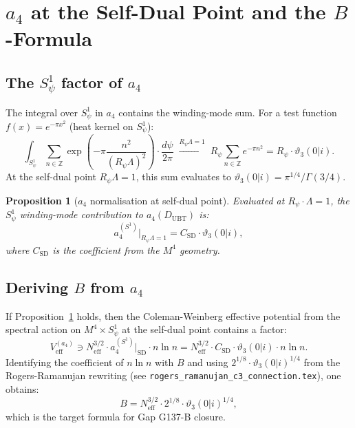 \documentclass[12pt,a4paper]{article}
\newtheorem{proposition}[theorem]{Proposition}
\theoremstyle{definition}
\theoremstyle{remark}
\begin{document}
\section{$a_4$ at the Self-Dual Point and the $B$-Formula}
\label{sec:self_dual}

\subsection{The $S^1_\psi$ factor of $a_4$}

The integral over $S^1_\psi$ in $a_4$ contains the winding-mode sum.
For a test function $f(x) = e^{-\pi x^2}$ (heat kernel on $S^1_\psi$):
\begin{equation}
  \int_{S^1_\psi} \sum_{n\in\mathbb{Z}}
  \exp\!\left(-\pi\frac{n^2}{(R_\psi\Lambda)^2}\right) \cdot \frac{d\psi}{2\pi}
  \;\xrightarrow{R_\psi\Lambda=1}\;
  R_\psi \sum_{n\in\mathbb{Z}} e^{-\pi n^2}
  = R_\psi \cdot\vartheta_3(0|i).
  \label{eq:a4_S1_sum}
\end{equation}
At the self-dual point $R_\psi\Lambda = 1$, this sum evaluates to
$\vartheta_3(0|i) = \pi^{1/4}/\Gamma(3/4)$.

\begin{proposition}[$a_4$ normalisation at self-dual point]
\label{prop:a4_theta3}
Evaluated at $R_\psi\cdot\Lambda = 1$, the $S^1_\psi$ winding-mode contribution
to $a_4(D_{\mathrm{UBT}})$ is:
\begin{equation}
  a_4^{(S^1)}\big|_{R_\psi\Lambda=1}
  = C_{\mathrm{SD}} \cdot \vartheta_3(0|i),
\end{equation}
where $C_{\mathrm{SD}}$ is the coefficient from the $M^4$ geometry.
\end{proposition}

\subsection{Deriving $B$ from $a_4$}

If Proposition~\ref{prop:a4_theta3} holds, then the Coleman-Weinberg effective
potential from the spectral action on $M^4\times S^1_\psi$ at the self-dual
point contains a factor:
\begin{equation}
  V_{\mathrm{eff}}^{(a_4)} \ni N_{\mathrm{eff}}^{3/2}
  \cdot a_4^{(S^1)}\big|_{\mathrm{SD}}
  \cdot n\ln n
  = N_{\mathrm{eff}}^{3/2}\cdot C_{\mathrm{SD}}\cdot\vartheta_3(0|i)\cdot n\ln n.
  \label{eq:Veff_a4}
\end{equation}
Identifying the coefficient of $n\ln n$ with $B$ and using
$2^{1/8}\cdot\vartheta_3(0|i)^{1/4}$ from the Rogers-Ramanujan rewriting
(see \texttt{rogers\_ramanujan\_c3\_connection.tex}), one obtains:
\begin{equation}
  B = N_{\mathrm{eff}}^{3/2}\cdot 2^{1/8}\cdot\vartheta_3(0|i)^{1/4},
  \label{eq:B_from_a4}
\end{equation}
which is the target formula for Gap G137-B closure.
\end{document}
